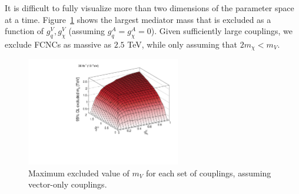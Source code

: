 It is difficult to fully visualize more than two dimensions of the parameter space at a time.
Figure~\ref{fig:mt:fcnc_obs_mgg} shows the largest mediator mass that is excluded as a function of $g_q^V,g_\chi^V$ (assuming $g_q^A = g_\chi^A = 0$).
Given sufficiently large couplings, we exclude FCNCs as massive as $2.5$ TeV, while only assuming that $2m_\chi < m_V$.


\begin{figure}[]
    \begin{center}
        \includegraphics[width=0.6\textwidth]{figures/monotop/results/fcnc3d_obs_vector.pdf}
        \caption{Maximum excluded value of $m_V$ for each set of couplings, assuming vector-only couplings.}
        \label{fig:mt:fcnc_obs_mgg}
    \end{center}
\end{figure}


